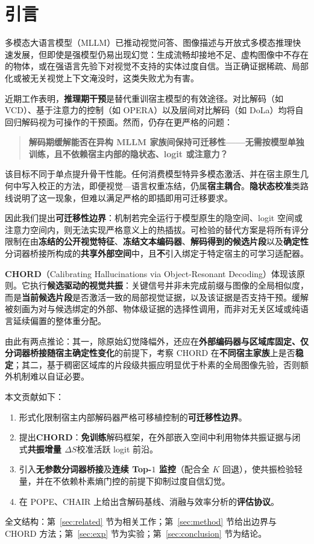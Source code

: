 \section{引言}
\label{sec:intro}

多模态大语言模型（MLLM）已推动视觉问答、图像描述与开放式多模态推理快速发展，但即使是强模型仍易出现幻觉：生成流畅却接地不足、虚构图像中不存在的物体，或在强语言先验下对视觉不支持的实体过度自信。当正确证据稀疏、局部化或被无关视觉上下文淹没时，这类失败尤为有害。

近期工作表明，\textbf{推理期干预}是替代重训宿主模型的有效途径。对比解码（如 VCD）、基于注意力的控制（如 OPERA）以及层间对比解码（如 DoLa）均将自回归解码视为可操作的干预面。然而，仍存在更严格的问题：

\begin{quote}
\textbf{解码期缓解能否在异构 MLLM 家族间保持可迁移性——无需按模型单独训练，且不依赖宿主内部的隐状态、logit 或注意力？}
\end{quote}

该目标不同于单点提升骨干性能。任何消费模型特异多模态激活、并在宿主原生几何中写入校正的方法，即便视觉—语言权重冻结，仍属\textbf{宿主耦合}。\textbf{隐状态校准}类路线说明了这一现象，但难以满足严格的即插即用可迁移要求。

因此我们提出\textbf{可迁移性边界}：机制若完全运行于模型原生的隐空间、logit 空间或注意力空间内，则无法实现严格意义上的热插拔。可检验的替代方案是将所有评分限制在由\textbf{冻结的公开视觉特征}、\textbf{冻结文本编码器}、\textbf{解码得到的候选片段}以及\textbf{确定性}分词器桥接所构成的\textbf{共享外部空间}中，且\textbf{不}引入绑定于特定宿主的可学习适配器。

\textbf{CHORD}（Calibrating Hallucinations via Object-Resonant Decoding）体现该原则。它执行\textbf{候选驱动的视觉共振}：关键信号并非未完成前缀与图像的全局相似度，而是\textbf{当前候选片段}是否激活一致的局部视觉证据，以及该证据是否支持干预。缓解被刻画为对与候选绑定的外部、物体级证据的选择性调用，而非对无关区域或纯语言延续偏置的整体重分配。

由此有两点推论：其一，除原始幻觉降幅外，还应在\textbf{外部编码器与区域库固定、仅分词器桥接随宿主确定性变化}的前提下，考察 CHORD 在\textbf{不同宿主家族}上是否\textbf{稳定}；其二，基于稠密区域库的片段级共振应明显优于朴素的全局图像先验，否则额外机制难以自证必要。

本文贡献如下：
\begin{enumerate}
  \item 形式化限制宿主内部解码器严格可移植控制的\textbf{可迁移性边界}。
  \item 提出\textbf{CHORD}：\textbf{免训练}解码框架，在外部嵌入空间中利用物体共振证据与闭式\textbf{共振增量 $\Delta S$}校准活跃 logit 前沿。
  \item 引入\textbf{无参数分词器桥接}及\textbf{连续 Top-$1$ 监控}（配合全 $K$ 回退），使共振检验轻量，并在不依赖朴素熵门控的前提下抑制过度自信幻觉。
  \item 在 POPE、CHAIR 上给出含解码基线、消融与效率分析的\textbf{评估协议}。
\end{enumerate}

全文结构：第~\ref{sec:related} 节为相关工作；第~\ref{sec:method} 节给出边界与 CHORD 方法；第~\ref{sec:exp} 节为实验；第~\ref{sec:conclusion} 节为结论。
